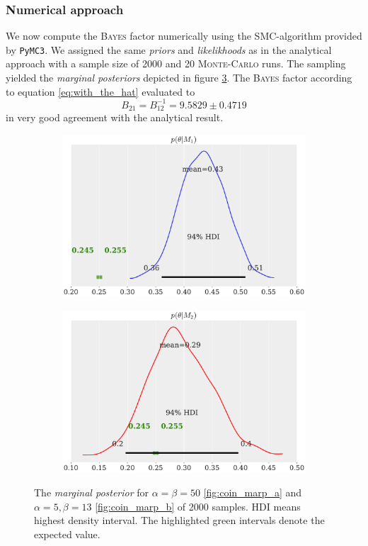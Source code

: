 \documentclass[%
 reprint,
 amsmath,amssymb,
 aps,
]{revtex4-1}
\begin{document}
\subsubsection{\textbf{Numerical approach}}
\noindent We now compute the \textsc{Bayes} factor numerically using the SMC-algorithm provided by \texttt{PyMC3}. We assigned the same \emph{priors} and \emph{likelikhoods} as in the analytical approach with a sample size of 2000 and 20 \textsc{Monte-Carlo} runs. The sampling yielded the \emph{marginal posteriors} depicted in figure \ref{fig:coin_marp}. 
The \textsc{Bayes} factor according to equation \eqref{eq:with_the_hat} evaluated to
$$B_{21}=B_{12}^{-1}=9.5829\pm0.4719$$
in very good agreement with the analytical result.
\begin{figure}[htbp]
	\begin{subfigure}{\linewidth}
		\includegraphics[width=0.9\linewidth]{coin_marp_m1.pdf}
		\subcaption{}\label{fig:coin_marp_a}
	\end{subfigure}
	\begin{subfigure}{\linewidth}
		\includegraphics[width=0.9\linewidth]{coin_marp_m2.pdf}
		\subcaption{}\label{fig:coin_marp_b}
	\end{subfigure}
	\caption{The \emph{marginal posterior} for $\alpha=\beta=50$ \eqref{fig:coin_marp_a} and $\alpha=5, \beta=13$ \eqref{fig:coin_marp_b} of 2000 samples. HDI means highest density interval. The highlighted green intervals denote the expected value.}\label{fig:coin_marp}
\end{figure}
\end{document}
